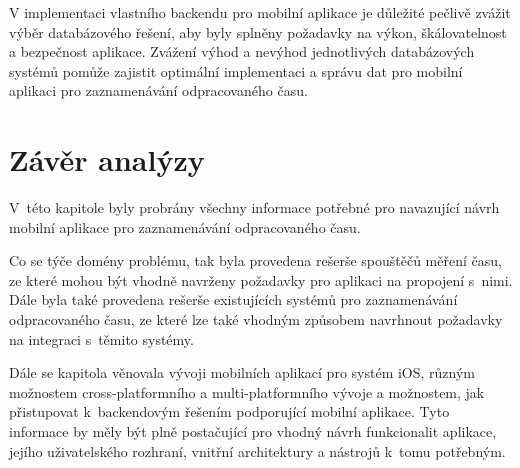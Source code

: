 V implementaci vlastního backendu pro mobilní aplikace je důležité pečlivě zvážit výběr databázového řešení, aby byly splněny požadavky na výkon, škálovatelnost a bezpečnost aplikace. Zvážení výhod a nevýhod jednotlivých databázových systémů pomůže zajistit optimální implementaci a správu dat pro mobilní aplikaci pro zaznamenávání odpracovaného času.

\section{Závěr analýzy}

V~této kapitole byly probrány všechny informace potřebné pro navazující návrh mobilní aplikace pro zaznamenávání odpracovaného času. 

Co se týče domény problému, tak byla provedena rešerše spouštěčů měření času, ze které mohou být vhodně navrženy požadavky pro aplikaci na propojení s~nimi. Dále byla také provedena rešerše existujících systémů pro zaznamenávání odpracovaného času, ze které lze také vhodným způsobem navrhnout požadavky na integraci s~těmito systémy.

Dále se kapitola věnovala vývoji mobilních aplikací pro systém iOS, různým možnostem cross-platformního a multi-platformního vývoje a možnostem, jak přistupovat k~backendovým řešením podporující mobilní aplikace. Tyto informace by měly být plně postačující pro vhodný návrh funkcionalit aplikace, jejího uživatelského rozhraní, vnitřní architektury a nástrojů k~tomu potřebným.











































